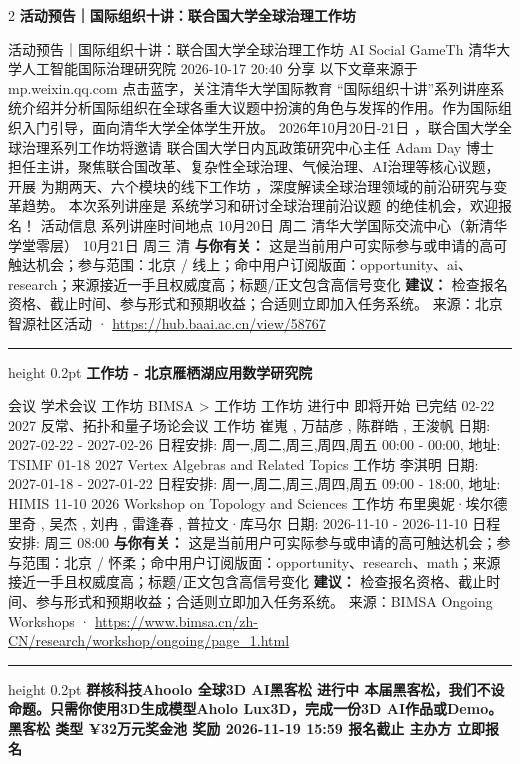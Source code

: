 \documentclass[10.5pt]{ctexart}
\begin{document}
\begin{multicols}{2}
{\large\bfseries 活动预告｜国际组织十讲：联合国大学全球治理工作坊}\par
活动预告｜国际组织十讲：联合国大学全球治理工作坊 AI Social GameTh 清华大学人工智能国际治理研究院 2026-10-17 20:40 分享 以下文章来源于mp.weixin.qq.com 点击蓝字，关注清华大学国际教育 “国际组织十讲”系列讲座系统介绍并分析国际组织在全球各重大议题中扮演的角色与发挥的作用。作为国际组织入门引导，面向清华大学全体学生开放。 2026年10月20日-21日 ，联合国大学全球治理系列工作坊将邀请 联合国大学日内瓦政策研究中心主任 Adam Day 博士 担任主讲，聚焦联合国改革、复杂性全球治理、气候治理、AI治理等核心议题，开展 为期两天、六个模块的线下工作坊 ，深度解读全球治理领域的前沿研究与变革趋势。 本次系列讲座是 系统学习和研讨全球治理前沿议题 的绝佳机会，欢迎报名！ 活动信息 系列讲座时间地点 10月20日 周二 清华大学国际交流中心（新清华学堂零层） 10月21日 周三 清
\textbf{与你有关：} 这是当前用户可实际参与或申请的高可触达机会；参与范围：北京 / 线上；命中用户订阅版面：opportunity、ai、research；来源接近一手且权威度高；标题/正文包含高信号变化
\textbf{建议：} 检查报名资格、截止时间、参与形式和预期收益；合适则立即加入任务系统。
{\footnotesize\color{ormuted} 来源：北京智源社区活动 · \url{https://hub.baai.ac.cn/view/58767}}
\vspace{2mm}
\hrule height 0.2pt
\vspace{2mm}
{\large\bfseries 工作坊 - 北京雁栖湖应用数学研究院}\par
会议 学术会议 工作坊 BIMSA > 工作坊 工作坊 进行中 即将开始 已完结 02-22 2027 反常、拓扑和量子场论会议 工作坊 崔嵬 , 万喆彦 , 陈群皓 , 王浚帆 日期: 2027-02-22 - 2027-02-26 日程安排: 周一,周二,周三,周四,周五 00:00 - 00:00, 地址: TSIMF 01-18 2027 Vertex Algebras and Related Topics 工作坊 李淇明 日期: 2027-01-18 - 2027-01-22 日程安排: 周一,周二,周三,周四,周五 09:00 - 18:00, 地址: HIMIS 11-10 2026 Workshop on Topology and Sciences 工作坊 布里奥妮·埃尔德里奇 , 吴杰 , 刘冉 , 雷逢春 , 普拉文·库马尔 日期: 2026-11-10 - 2026-11-10 日程安排: 周三 08:00
\textbf{与你有关：} 这是当前用户可实际参与或申请的高可触达机会；参与范围：北京 / 怀柔；命中用户订阅版面：opportunity、research、math；来源接近一手且权威度高；标题/正文包含高信号变化
\textbf{建议：} 检查报名资格、截止时间、参与形式和预期收益；合适则立即加入任务系统。
{\footnotesize\color{ormuted} 来源：BIMSA Ongoing Workshops · \url{https://www.bimsa.cn/zh-CN/research/workshop/ongoing/page_1.html}}
\vspace{2mm}
\hrule height 0.2pt
\vspace{2mm}
{\large\bfseries 群核科技Ahoolo 全球3D AI黑客松 进行中 本届黑客松，我们不设命题。只需你使用3D生成模型Aholo Lux3D，完成一份3D AI作品或Demo。 黑客松 类型 ¥32万元奖金池 奖励 2026-11-19 15:59 报名截止 主办方 立即报名}\par

\end{multicols}
\end{document}
